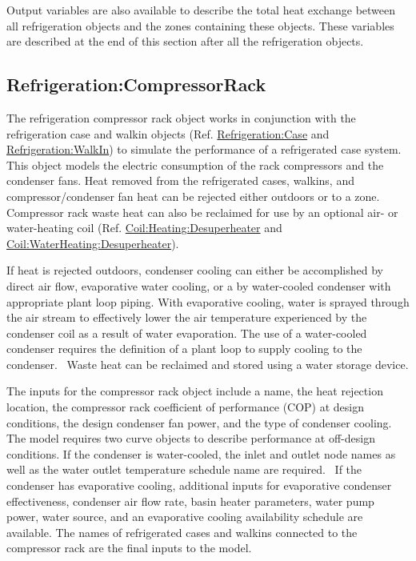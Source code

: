 Output variables are also available to describe the total heat exchange between all refrigeration objects and the zones containing these objects. These variables are described at the end of this section after all the refrigeration objects.

\subsection{Refrigeration:CompressorRack}\label{refrigerationcompressorrack}

The refrigeration compressor rack object works in conjunction with the refrigeration case and walkin objects (Ref. \hyperref[refrigerationcase]{Refrigeration:Case} and \hyperref[refrigerationwalkin]{Refrigeration:WalkIn}) to simulate the performance of a refrigerated case system. This object models the electric consumption of the rack compressors and the condenser fans. Heat removed from the refrigerated cases, walkins, and compressor/condenser fan heat can be rejected either outdoors or to a zone. Compressor rack waste heat can also be reclaimed for use by an optional air- or water-heating coil (Ref. \hyperref[coilheatingdesuperheater]{Coil:Heating:Desuperheater} and \hyperref[coilwaterheatingdesuperheater]{Coil:WaterHeating:Desuperheater}).

If heat is rejected outdoors, condenser cooling can either be accomplished by direct air flow, evaporative water cooling, or a by water-cooled condenser with appropriate plant loop piping. With evaporative cooling, water is sprayed through the air stream to effectively lower the air temperature experienced by the condenser coil as a result of water evaporation. The use of a water-cooled condenser requires the definition of a plant loop to supply cooling to the condenser.~ Waste heat can be reclaimed and stored using a water storage device.

The inputs for the compressor rack object include a name, the heat rejection location, the compressor rack coefficient of performance (COP) at design conditions, the design condenser fan power, and the type of condenser cooling. The model requires two curve objects to describe performance at off-design conditions. If the condenser is water-cooled, the inlet and outlet node names as well as the water outlet temperature schedule name are required.~ If the condenser has evaporative cooling, additional inputs for evaporative condenser effectiveness, condenser air flow rate, basin heater parameters, water pump power, water source, and an evaporative cooling availability schedule are available. The names of refrigerated cases and walkins connected to the compressor rack are the final inputs to the model.


